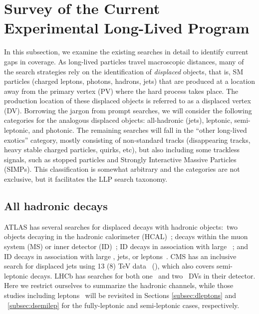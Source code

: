 \section{Survey of the Current Experimental Long-Lived Program}
\label{sec:survey}
In this subsection, we examine the existing searches in detail to identify current gaps in coverage.  As long-lived particles travel macroscopic distances, many of the search strategies rely on the identification of \emph{displaced} objects, that is, SM particles (charged leptons, photons, hadrons, jets) that are produced at a location away from the primary vertex (PV) where the hard process takes place.
The production location of these displaced objects is referred to as a displaced vertex (DV). Borrowing the jargon from prompt searches, we will consider the following categories for the analogous displaced objects: all-hadronic (jets), leptonic, semi-leptonic, and photonic. The remaining searches will fall in the ``other long-lived exotics'' category, mostly consisting of non-standard tracks (disappearing tracks,  heavy stable charged particles, quirks, etc), but also including some trackless signals, such as stopped particles and Strongly Interactive Massive Particles (SIMPs). 
This classification is somewhat arbitrary and the categories are not exclusive, but it facilitates the LLP search taxonomy.

\subsection{All hadronic decays}
\label{subsec:djets}

ATLAS has several searches for displaced decays with hadronic objects:~two objects decaying in the hadronic calorimeter (HCAL)~\cite{ATLAS-CONF-2016-103,CalRatio8TeV}; decays within the muon system (MS) or inner detector (ID)~\cite{Aad:2015uaa}; ID decays in association with large \met ~\cite{Aaboud:2017iio}; and ID decays in association with large 
\met, jets, or leptons~\cite{Aad:2015rba}.  CMS has an inclusive search for displaced jets using 13 (8) TeV data~\cite{CMS:2017oor} (\cite{CMS:2014wda}), which also covers semi-leptonic decays. LHCb has searches for both one~\cite{Aaij:2017mic} and two~\cite{Aaij:2016isa} DVs in their detector. Here we restrict ourselves to summarize the hadronic channels, while those studies including leptons~\cite{Aad:2015rba,CMS:2017oor} will be revisited in Sections \ref{subsec:dleptons} and ~\ref{subsec:dsemilep} for the fully-leptonic and semi-leptonic cases, respectively.

